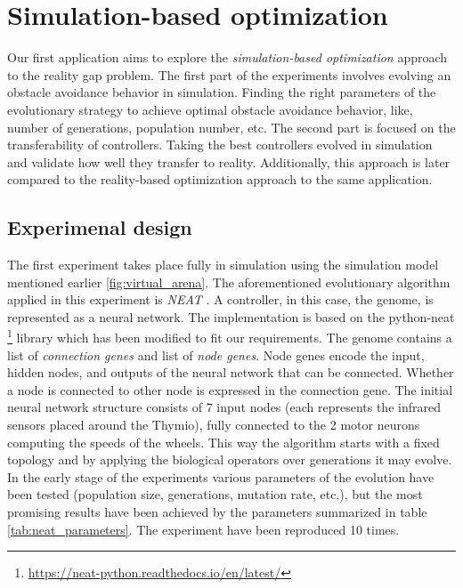 \section{Simulation-based optimization}

Our first application aims to explore the \emph{simulation-based optimization} approach to the reality gap problem. The first part of the experiments involves evolving an obstacle avoidance behavior in simulation. Finding the right parameters of the evolutionary strategy to achieve optimal obstacle avoidance behavior, like, number of generations, population number, etc. The second part is focused on the transferability of controllers. Taking the best controllers evolved in simulation and validate how well they transfer to reality. Additionally, this approach is later compared to the reality-based optimization approach to the same application.

\subsection{Experimenal design}

The first experiment takes place fully in simulation using the simulation model mentioned earlier \ref{fig:virtual_arena}. The aforementioned evolutionary algorithm applied in this experiment is \emph{NEAT} \citep{stanley2002evolving}. A controller, in this case, the genome, is represented as a neural network. The implementation is based on the python-neat \footnote{\url{https://neat-python.readthedocs.io/en/latest/}} library which has been modified to fit our requirements. The genome contains a list of \emph{connection genes} and list of \emph{node genes}. Node genes encode the input, hidden nodes, and outputs of the neural network that can be connected. Whether a node is connected to other node is expressed in the connection gene. The initial neural network structure consists of 7 input nodes (each represents the infrared sensors placed around the Thymio), fully connected to the 2 motor neurons computing the speeds of the wheels. This way the algorithm starts with a fixed topology and by applying the biological operators over generations it may evolve. In the early stage of the experiments various parameters of the evolution have been tested (population size, generations, mutation rate, etc.), but the most promising results have been achieved by the parameters summarized in table \ref{tab:neat_parameters}. The experiment have been reproduced 10 times.

